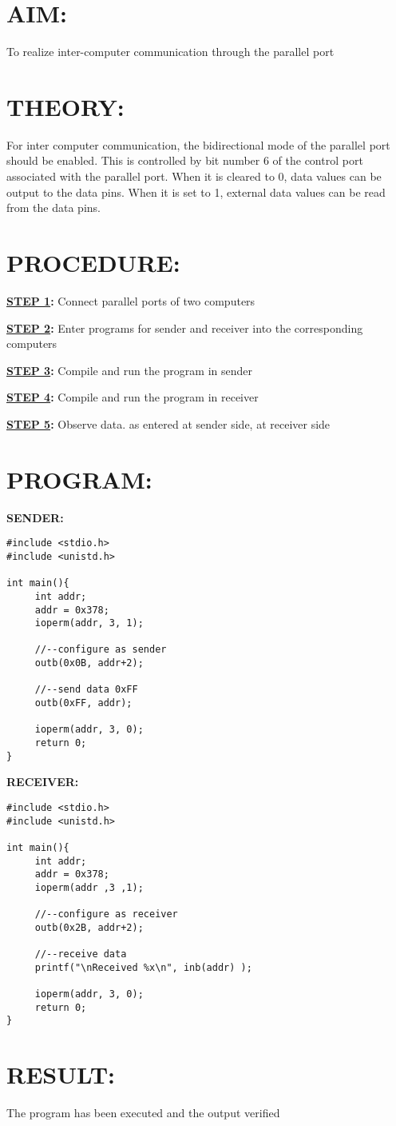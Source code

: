 
\section*{AIM:}
To realize inter-computer communication through the parallel port
\section*{THEORY:}
For inter computer communication, the bidirectional mode of the parallel port should be enabled. This is controlled by bit number 6 of the control port associated with the parallel port. When it is cleared to 0, data values can be output to the data pins. When it is set to 1, external data values can be read from the data pins.
\section*{PROCEDURE:}
\textbf{\underline{STEP 1}:} Connect parallel ports of two computers

\textbf{\underline{STEP 2}:} Enter programs for sender and receiver into the corresponding computers

\textbf{\underline{STEP 3}:} Compile and run the program in sender

\textbf{\underline{STEP 4}:} Compile and run the program in receiver

\textbf{\underline{STEP 5}:} Observe data. as entered at sender side, at receiver side

\section*{PROGRAM:}
\textbf{SENDER:}
\begin{lstlisting}
#include <stdio.h>
#include <unistd.h>

int main(){
     int addr;
     addr = 0x378;
     ioperm(addr, 3, 1);
     
     //--configure as sender
     outb(0x0B, addr+2);
     
     //--send data 0xFF
     outb(0xFF, addr);
     
     ioperm(addr, 3, 0);
     return 0;
}
\end{lstlisting}

\vspace{20pt}
\textbf{RECEIVER:}
\begin{lstlisting}
#include <stdio.h>
#include <unistd.h>

int main(){
     int addr;
     addr = 0x378;
     ioperm(addr ,3 ,1);
     
     //--configure as receiver
     outb(0x2B, addr+2);
     
     //--receive data
     printf("\nReceived %x\n", inb(addr) );
     
     ioperm(addr, 3, 0);
     return 0;
}
\end{lstlisting}

\section*{RESULT:}
The program has been executed and the output verified
%
%
%
%
